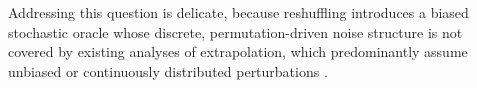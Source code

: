 %
Addressing this question is delicate, because reshuffling introduces a biased stochastic oracle whose discrete, permutation-driven noise structure is not covered by
existing analyses of extrapolation, which predominantly assume unbiased or continuously distributed perturbations \citep{dieuleveut2020bridging,sheshukova2024nonasymptotic,vlatakis2024stochastic}.


